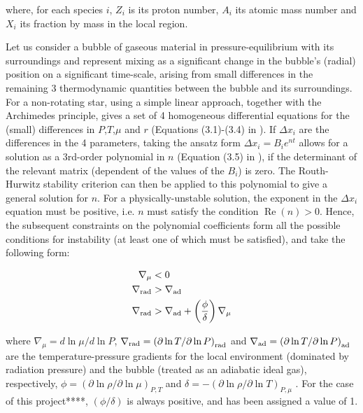\documentclass[12pt, a4paper]{report}
\begin{document}
where, for each species $i$, $Z_{i}$ is its proton number, $A_{i}$ its atomic mass number and $X_{i}$ its fraction by mass in the local region.

Let us consider a bubble of gaseous material in pressure-equilibrium with its surroundings and represent mixing as a significant change in the bubble's (radial) position on a significant time-scale, arising from small differences in the remaining 3 thermodynamic quantities between the bubble and its surroundings. For a non-rotating star, using a simple linear approach, together with the Archimedes principle, gives a set of 4 homogeneous differential equations for the (small) differences in $P$,$T$,$\mu$ and $r$ (Equations (3.1)-(3.4) in \cite{2017RSOS....470192S}). If $\Delta x_{i}$ are the differences in the 4 parameters, taking the ansatz form $\Delta x_{i} = B_{i} e^{nt}$ allows for a solution as a 3rd-order polynomial in $n$ (Equation (3.5) in \cite{2017RSOS....470192S}), if the determinant of the relevant matrix (dependent of the values of the $B_{i}$) is zero. The Routh-Hurwitz stability criterion can then be applied to this polynomial to give a general solution for $n$. For a physically-unstable solution, the exponent in the $\Delta x_{i}$ equation must be positive, i.e. $n$ must satisfy the condition $\operatorname{Re}(n) > 0$. Hence, the subsequent constraints on the polynomial coefficients form all the possible conditions for instability (at least one of which must be satisfied), and take the following form:

\begin{align}
\nabla _{\mu} &< 0 \label{mu_inv_ineq} \\
\nabla _{\textnormal{rad}} &> \nabla _{\textnormal{ad}} \label{schwarz_ineq} \\
\nabla _{\textnormal{rad}} &> \nabla _{\textnormal{ad}} + \left( \frac{\phi}{\delta} \right) \nabla _{\mu} \label{ledoux_ineq}
\end{align}

where $\nabla _{\mu} = d\ln\mu / d\ln P$, $\nabla _{\textnormal{rad}} = \left(\partial\ln T / \partial\ln P \right)_{\textnormal{rad}}$ and $\nabla _{\textnormal{ad}} = \left(\partial\ln T / \partial\ln P \right)_{\textnormal{ad}}$ are the temperature-pressure gradients for the local environment (dominated by radiation pressure) and the bubble (treated as an adiabatic ideal gas), respectively, $\phi = \left( \partial \ln\rho / \partial \ln\mu \right)_{P,T}$ and $\delta = -\left( \partial \ln\rho / \partial \ln T \right)_{P,\mu}$  \citep{1980A&A....91..175K}. For the case of this project****, $(\phi/\delta)$ is always positive, and has been assigned a value of 1.
\end{document}
